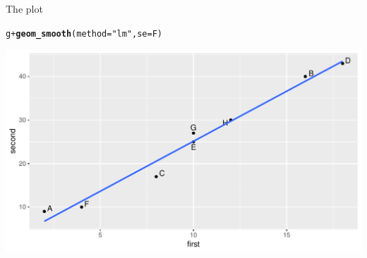 \documentclass[unknownkeysallowed]{beamer}\usepackage[]{graphicx}\usepackage[]{color}
\makeatletter
\def\maxwidth{ %
  \ifdim\Gin@nat@width>\linewidth
    \linewidth
  \else
    \Gin@nat@width
  \fi
}
\newcommand{\hlstr}[1]{\textcolor[rgb]{0.192,0.494,0.8}{#1}}%
\newcommand{\hlopt}[1]{\textcolor[rgb]{0,0,0}{#1}}%
\newcommand{\hlstd}[1]{\textcolor[rgb]{0.345,0.345,0.345}{#1}}%
\newcommand{\hlkwc}[1]{\textcolor[rgb]{0.333,0.667,0.333}{#1}}%
\newcommand{\hlkwd}[1]{\textcolor[rgb]{0.737,0.353,0.396}{\textbf{#1}}}%
\newenvironment{kframe}{%
 \def\at@end@of@kframe{}%
 \ifinner\ifhmode%
  \def\at@end@of@kframe{\end{minipage}}%
  \begin{minipage}{\columnwidth}%
 \fi\fi%
 \def\FrameCommand##1{\hskip\@totalleftmargin \hskip-\fboxsep
 \colorbox{shadecolor}{##1}\hskip-\fboxsep
     \hskip-\linewidth \hskip-\@totalleftmargin \hskip\columnwidth}%
 \MakeFramed {\advance\hsize-\width
   \@totalleftmargin\z@ \linewidth\hsize
   \@setminipage}}%
 {\par\unskip\endMakeFramed%
 \at@end@of@kframe}
\newenvironment{knitrout}{}{} %
\makeatother
\begin{document}
\begin{frame}[fragile]{The plot}

\begin{knitrout}
\color{fgcolor}\begin{kframe}
\begin{alltt}
\hlstd{g}\hlopt{+}\hlkwd{geom_smooth}\hlstd{(}\hlkwc{method}\hlstd{=}\hlstr{"lm"}\hlstd{,}\hlkwc{se}\hlstd{=F)}
\end{alltt}
\end{kframe}
\includegraphics[width=\maxwidth]{figure/ff2-1} 

\end{knitrout}
  
  
\end{frame}
\end{document}
